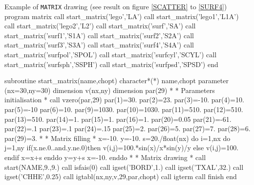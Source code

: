 \begin{XMPt}{Example of {\tt MATRIX} drawing (see result on figure 
\ref{SCATTER} to \ref{SURF4})}
      program matrix 
      call start_matrix('lego','LA')
      call start_matrix('lego1','L1A')
      call start_matrix('lego2','L2')
      call start_matrix('surf','SA')
      call start_matrix('surf1','S1A')
      call start_matrix('surf2','S2A')
      call start_matrix('surf3','S3A')
      call start_matrix('surf4','S4A')
      call start_matrix('surfpol','SPOL')
      call start_matrix('surfcyl','SCYL')
      call start_matrix('surfsph','SSPH')
      call start_matrix('surfpsd','SPSD')
      end

      subroutine start_matrix(name,chopt)
      character*(*) name,chopt
      parameter (nx=30,ny=30)
      dimension v(nx,ny)
      dimension par(29)
*
*              Parameters initialisation
*
      call vzero(par,29)
      par(1)=30.
      par(2)=23.
      par(3)=-10.
      par(4)=10.
      par(5)=-10
      par(6)=10.
      par(9)=1030.
      par(10)=1030.
      par(11)=510.
      par(12)=510.
      par(13)=510.
      par(14)=1.
      par(15)=1.
      par(16)=1.
      par(20)=0.05
      par(21)=-61.
      par(22)=.1
      par(23)=.1
      par(24)=.15
      par(25)=2.
      par(26)=5.
      par(27)=7.
      par(28)=6.
      par(29)=3.
*
*              Matrix filling
*
      x=-10.
      y=-10.
      s=20./float(nx)
      do i=1,nx
         do j=1,ny
            if(x.ne.0..and.y.ne.0)then
               v(i,j)=100.*sin(x)/x*sin(y)/y
            else
               v(i,j)=100.
            endif
            x=x+s
         enddo
         y=y+s
         x=-10.
      enddo
*
*              Matrix drawing
*
      call start(NAME,9.,9.)
      call isfais(0)
      call igset('BORD',1.)
      call igset('TXAL',32.)
      call igset('CHHE',0.25)
      call igtabl(nx,ny,v,29,par,chopt)
      call igterm
      call finish
      end
\end{XMPt}


